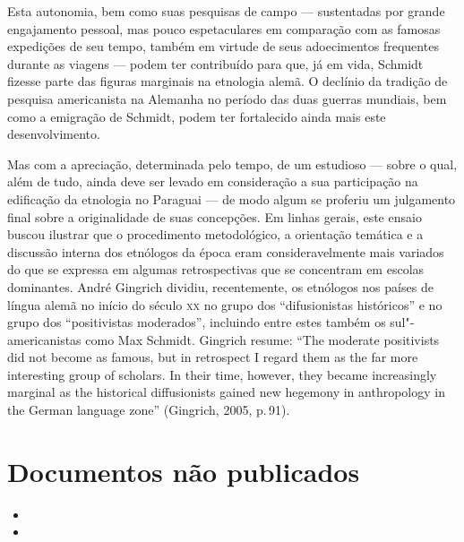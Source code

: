 Esta autonomia, bem como suas pesquisas de campo --- sustentadas por
grande engajamento pessoal, mas pouco espetaculares em comparação com
as famosas expedições de seu tempo, também em virtude de seus
adoecimentos frequentes durante as viagens --- podem ter contribuído para
que, já em vida, Schmidt fizesse parte das figuras marginais na
etnologia alemã. O declínio da tradição de pesquisa americanista na
Alemanha no período das duas guerras mundiais, bem como a emigração de
Schmidt, podem ter fortalecido ainda mais este desenvolvimento.

Mas com a apreciação, determinada pelo tempo, de um estudioso --- sobre o
qual, além de tudo, ainda deve ser levado em consideração a sua
participação na edificação da etnologia no Paraguai --- de modo algum se
proferiu um julgamento final sobre a originalidade de suas concepções.
Em linhas gerais, este ensaio buscou ilustrar que o procedimento
metodológico, a orientação temática e a discussão interna dos etnólogos
da época eram consideravelmente mais variados do que se expressa em
algumas retrospectivas que se concentram em escolas dominantes. André
Gingrich dividiu, recentemente, os etnólogos nos países de língua alemã
no início do século \textsc{xx} no grupo dos ``difusionistas históricos'' e no
grupo dos ``positivistas moderados'', incluindo entre estes também os
sul"-americanistas como Max Schmidt. Gingrich resume: ``The moderate
positivists did not become as famous, but in retrospect I regard them as
the far more interesting group of scholars. In their time, however, they
became increasingly marginal as the historical diffusionists gained new
hegemony in anthropology in the German language zone'' (Gingrich, 2005,
p.\,91).

\section{Documentos não publicados}

\begin{itemize}
\item[]

\item[]
\end{itemize}


